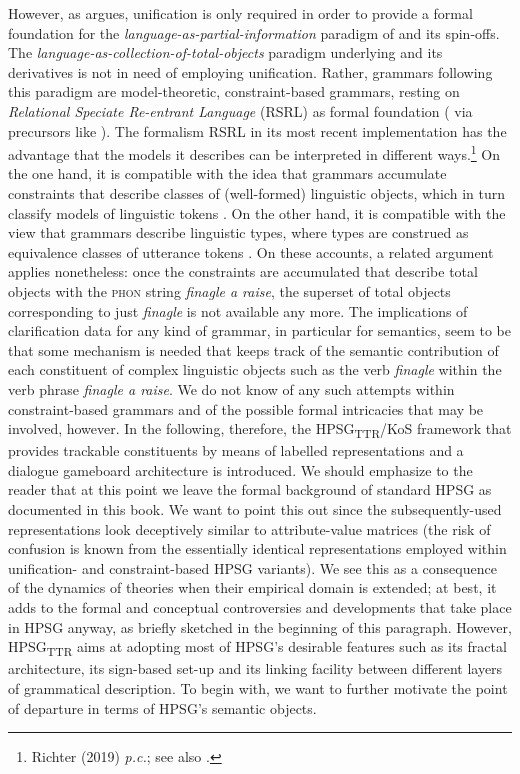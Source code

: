\documentclass[output=paper
	        ,collection
	        ,collectionchapter
 	        ,biblatex
                ,babelshorthands
                ,newtxmath
                ,draftmode
                ,colorlinks, citecolor=brown
]{langscibook}
\begin{document}
However, as \citet[Chapter 2]{Richter:2000} argues, unification is only required in order to provide a formal foundation for the \textit{language-as-partial-information} paradigm of \citet{Pollard:Sag:1987} and its spin-offs. 
%
The \textit{language-as-collection-of-total-objects} paradigm underlying \citet{Pollard:Sag:1994} and its derivatives is not in need of employing unification.
%
Rather, grammars following this paradigm are model-theoretic, constraint-based grammars, resting on \emph{Relational Speciate Re-entrant Language} (RSRL) as formal foundation (\citealt{Richter:2000} via precursors like \citealt{Penn:1999}).
%
The formalism RSRL in its most recent implementation \citep{Richter:2004} has the advantage that the models it describes can be interpreted in different ways.\footnote{Richter (2019) \textit{p.c.}; see also .}
%
On the one hand, it is compatible with the idea that grammars accumulate constraints that describe classes of (well-formed) linguistic objects, which in turn classify models of linguistic tokens
\citep{King:1999}.
%
On the other hand, it is compatible with the view that grammars describe linguistic types, where types are construed as equivalence classes of utterance tokens \citep{Pollard:1999}.
%
On these accounts, a related argument applies nonetheless: once the constraints are accumulated that describe total objects with the \textsc{phon} string \textit{finagle a raise}, the superset of total objects corresponding to just \textit{finagle} is not available any more.
%
The implications of clarification data for any kind of grammar, in particular for semantics, seem to be that some mechanism is needed that keeps track of the semantic contribution of each constituent of complex linguistic objects such as the verb \textit{finagle} within the verb phrase \textit{finagle a raise}.
%
We do not know of any such attempts within constraint-based grammars and of the possible formal intricacies that may be involved, however.
%
In the following, therefore, the HPSG\textsubscript{TTR}/KoS framework that provides trackable constituents by means of labelled representations and a dialogue gameboard architecture is introduced.
%
We should emphasize to the reader that at this point we leave the formal background of standard HPSG as documented in this book.
%
We want to point this out since the subsequently-used representations look deceptively similar to attribute-value matrices (the risk of confusion is known from the essentially identical representations employed within unification- and constraint-based HPSG variants).
%
We see this as a consequence of the dynamics of theories when their empirical domain is extended; at best, it adds to the formal and conceptual controversies and developments that take place in HPSG anyway, as briefly sketched in the beginning of this paragraph. 
%
However, HPSG\textsubscript{TTR} aims at adopting most of HPSG's desirable features such as its fractal architecture, its sign-based set-up and its linking facility between different layers of grammatical description. 
%
To begin with, we want to further motivate the point of departure in terms of HPSG's semantic objects.
\end{document}
